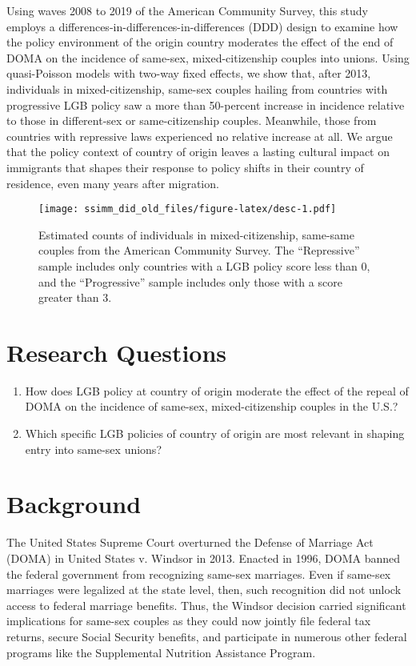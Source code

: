 \documentclass[
  12pt,
]{article}
\begin{document}
Using waves 2008 to 2019 of the American Community Survey, this study employs a differences-in-differences-in-differences (DDD) design to examine how the policy environment of the origin country moderates the effect of the end of DOMA on the incidence of same-sex, mixed-citizenship couples into unions. Using quasi-Poisson models with two-way fixed effects, we show that, after 2013, individuals in mixed-citizenship, same-sex couples hailing from countries with progressive LGB policy saw a more than 50-percent increase in incidence relative to those in different-sex or same-citizenship couples. Meanwhile, those from countries with repressive laws experienced no relative increase at all. We argue that the policy context of country of origin leaves a lasting cultural impact on immigrants that shapes their response to policy shifts in their country of residence, even many years after migration.

\begin{figure}
\centering
\texttt{[image: ssimm\_did\_old\_files/figure-latex/desc-1.pdf]}
\caption{\label{fig:desc}Estimated counts of individuals in mixed-citizenship, same-same couples from the American Community Survey. The ``Repressive'' sample includes only countries with a LGB policy score less than 0, and the ``Progressive'' sample includes only those with a score greater than 3.}
\end{figure}

\hypertarget{research-questions}{%
\section{Research Questions}\label{research-questions}}

\begin{enumerate}
\def\labelenumi{\arabic{enumi}.}
\item
  How does LGB policy at country of origin moderate the effect of the repeal of DOMA on the incidence of same-sex, mixed-citizenship couples in the U.S.?
\item
  Which specific LGB policies of country of origin are most relevant in shaping entry into same-sex unions?
\end{enumerate}

\hypertarget{background}{%
\section{Background}\label{background}}

The United States Supreme Court overturned the Defense of Marriage Act (DOMA) in United States v. Windsor in 2013. Enacted in 1996, DOMA banned the federal government from recognizing same-sex marriages. Even if same-sex marriages were legalized at the state level, then, such recognition did not unlock access to federal marriage benefits. Thus, the Windsor decision carried significant implications for same-sex couples as they could now jointly file federal tax returns, secure Social Security benefits, and participate in numerous other federal programs like the Supplemental Nutrition Assistance Program.
\end{document}
